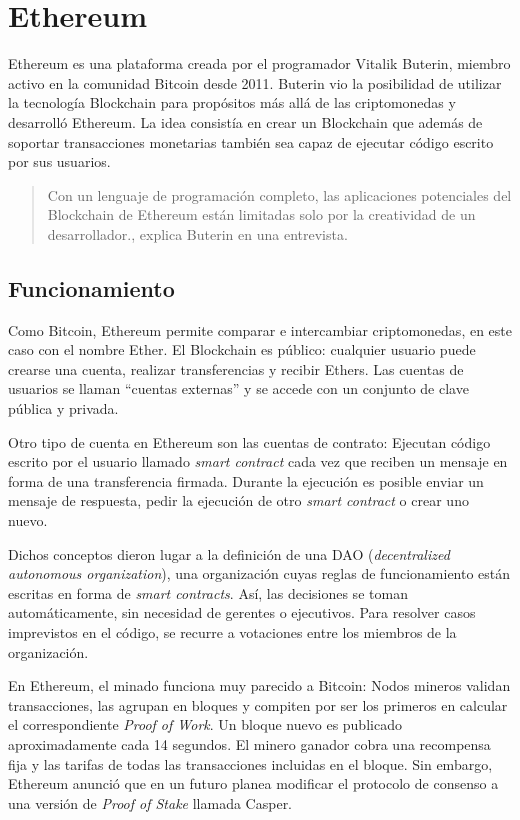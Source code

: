 \section{Ethereum}

Ethereum es una plataforma creada por el programador Vitalik Buterin, miembro activo en la comunidad Bitcoin desde 2011.\cite{bitcoinmagazine}
Buterin vio la posibilidad de utilizar la tecnología Blockchain para propósitos más allá de las criptomonedas y desarrolló Ethereum. La idea consistía en crear un Blockchain que además de soportar transacciones monetarias también sea capaz de ejecutar código escrito por sus usuarios.

\begin{quote}
Con un lenguaje de programación completo, las aplicaciones potenciales del Blockchain de Ethereum están limitadas solo por la creatividad de un desarrollador.\cite{buterin_interview}, explica Buterin en una entrevista.
\end{quote}

\subsection{Funcionamiento}

Como Bitcoin, Ethereum permite comparar e intercambiar criptomonedas, en este caso con el nombre Ether. El Blockchain es público: cualquier usuario puede crearse una cuenta, realizar transferencias y recibir Ethers. Las cuentas de usuarios se llaman ``cuentas externas'' y se accede con un conjunto de clave pública y privada.

Otro tipo de cuenta en Ethereum son las cuentas de contrato: Ejecutan código escrito por el usuario llamado \textit{smart contract} cada vez que reciben un mensaje en forma de una transferencia firmada. Durante la ejecución es posible enviar un mensaje de respuesta, pedir la ejecución de otro \textit{smart contract} o crear uno nuevo.

Dichos conceptos dieron lugar a la definición de una DAO (\textit{decentralized autonomous organization}), una organización cuyas reglas de funcionamiento están escritas en forma de \textit{smart contracts}. Así, las decisiones se toman automáticamente, sin necesidad de gerentes o ejecutivos. Para resolver casos imprevistos en el código, se recurre a votaciones entre los miembros de la organización.

En Ethereum, el minado funciona muy parecido a Bitcoin: Nodos mineros validan transacciones, las agrupan en bloques y compiten por ser los primeros en calcular el correspondiente \textit{Proof of Work}. Un bloque nuevo es publicado aproximadamente cada 14 segundos.\cite{etherscan} El minero ganador cobra una recompensa fija y las tarifas de todas las transacciones incluidas en el bloque. Sin embargo, Ethereum anunció que en un futuro planea modificar el protocolo de consenso a una versión de \textit{Proof of Stake} llamada Casper.


